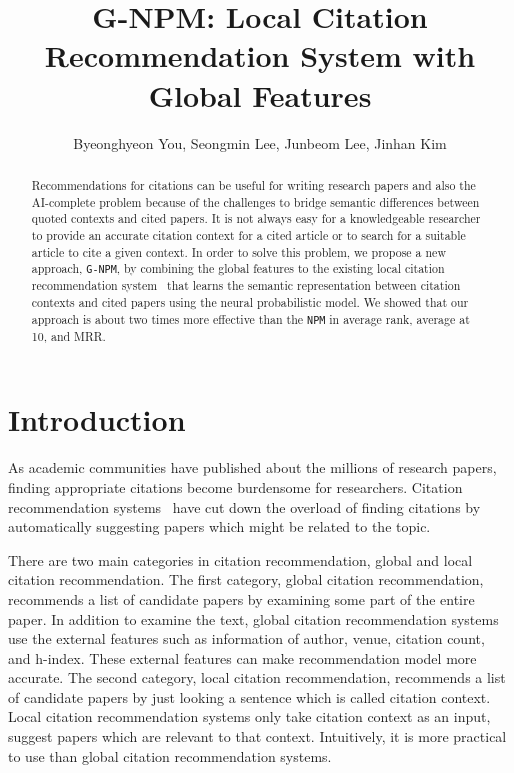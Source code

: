 \documentclass{llncs}
\newcommand{\name}{\texttt{G-NPM}\xspace}
\newcommand{\npm}{\texttt{NPM}\xspace}
\begin{document}
\title{G-NPM: Local Citation Recommendation System with Global Features}

\author{Byeonghyeon You, Seongmin Lee, Junbeom Lee, Jinhan Kim}


\maketitle

\begin{abstract}
Recommendations for citations can be useful for writing research papers and also the AI-complete problem because of the challenges to bridge semantic differences between quoted contexts and cited papers.
It is not always easy for a knowledgeable researcher to provide an accurate citation context for a cited article or to search for a suitable article to cite a given context.
In order to solve this problem, we propose a new approach, \name, by combining the global features to the existing local citation recommendation system~\cite{Huang:2015:NPM:2886521.2886655} that learns the semantic representation between citation contexts and cited papers using the neural probabilistic model. We showed that our approach is about two times more effective than the \npm in average rank, average at 10, and MRR.

\end{abstract}

\section{Introduction}
\label{sec:introduction}
As academic communities have published about the millions of research papers, finding appropriate citations become burdensome for researchers. Citation recommendation systems~\cite{ren2014cluscite,Huang:2015:NPM:2886521.2886655,Bethard:2010:ICL:1871437.1871517} have cut down the overload of finding citations by automatically suggesting papers which might be related to the topic.


There are two main categories in citation recommendation, global and local citation recommendation.
The first category, global citation recommendation, recommends a list of candidate papers by examining some part of the entire paper. In addition to examine the text, global citation recommendation systems use the external features such as information of author, venue, citation count, and h-index. These external features can make recommendation model more accurate.
The second category, local citation recommendation, recommends a list of candidate papers by just looking a sentence which is called citation context. Local citation recommendation systems only take citation context as an input, suggest papers which are relevant to that context. Intuitively, it is more practical to use than global citation recommendation systems.
\end{document}
